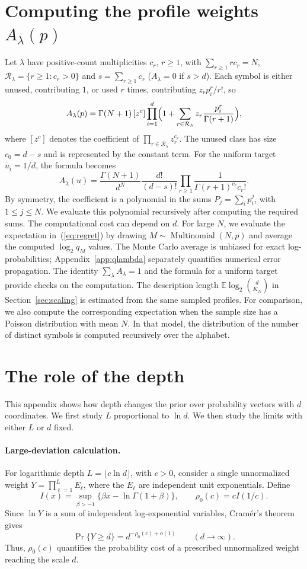 \documentclass[anon]{alt2027}
\newcommand{\Mult}{\operatorname{Multinomial}}
\newcommand{\E}{\mathbb{E}}
\renewcommand{\eqref}[1]{(\ref{#1})}
\begin{document}
\section{Computing the profile weights \texorpdfstring{$A_{\lambda}(p)$}{A-of-lambda(p)}}
\label{app:alambda}
Let $\lambda$ have positive-count multiplicities $c_r$, $r\ge1$, with $\sum_{r\ge1}rc_r=N$, $\mathcal R_\lambda=\{r\ge1:c_r>0\}$ and $s=\sum_{r\ge1}c_r$ ($A_\lambda=0$ if $s>d$). Each symbol is either unused, contributing $1$, or used $r$ times, contributing $z_rp_i^r/r!$, so
\[
A_\lambda(p)=\Gamma(N+1)\,[z^c]\prod_{i=1}^d\Bigl(1+\sum_{r\in\mathcal R_\lambda}z_r\frac{p_i^r}{\Gamma(r+1)}\Bigr),
\]
where $[z^c]$ denotes the coefficient of $\prod_{r\in\mathcal R_\lambda}z_r^{c_r}$. The unused class has size $c_0=d-s$ and is represented by the constant term. For the uniform target $u_i=1/d$, the formula becomes \[A_\lambda(u)=\frac{\Gamma(N+1)}{d^N}\frac{d!}{(d-s)!}\prod_{r\ge1}\frac{1}{\Gamma(r+1)^{c_r}c_r!}.\] By symmetry, the coefficient is a polynomial in the sums $P_j=\sum_i p_i^j$, with $1\le j\le N$. We evaluate this polynomial recursively after computing the required sums. The computational cost can depend on $d$. For large $N$, we evaluate the expectation in~\eqref{eq:regret} by drawing $M\sim\Mult(N,p)$ and average the computed $\log_2 q_M$ values. The Monte Carlo average is unbiased for exact log-probabilities; Appendix~\ref{app:qlambda} separately quantifies numerical error propagation. The identity $\sum_\lambda A_\lambda=1$ and the formula for a uniform target provide checks on the computation. The description length $\E\log_2\binom{d}{K_N}$ in Section~\ref{sec:scaling} is estimated from the same sampled profiles. For comparison, we also compute the corresponding expectation when the sample size has a Poisson distribution with mean $N$. In that model, the distribution of the number of distinct symbols is computed recursively over the alphabet.

\section{The role of the depth}
\label{app:fixedd}

This appendix shows how depth changes the prior over probability vectors with $d$ coordinates. We first study $L$ proportional to $\ln d$. We then study the limits with either $L$ or $d$ fixed. 

\paragraph{Large-deviation calculation.} For logarithmic depth \(L=\lfloor c\ln d\rfloor\), with \(c>0\), consider a single unnormalized weight \(Y=\prod_{\ell=1}^{L}E_\ell\), where the \(E_\ell\) are independent unit exponentials. Define
\[
I(x)=\sup_{\beta>-1}\{\beta x-\ln\Gamma(1+\beta)\},
\qquad
\rho_0(c)=cI(1/c).
\]
Since \(\ln Y\) is a sum of independent log-exponential variables, Cramér’s theorem gives
\[
\Pr\{Y\ge d\}=d^{-\rho_0(c)+o(1)}
\qquad(d\to\infty).
\]
Thus, \(\rho_0(c)\) quantifies the probability cost of a prescribed unnormalized weight reaching the scale \(d\).
\end{document}
